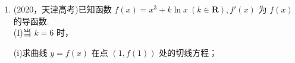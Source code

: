 \begin{enumerate}[label={【\textbf{例\thechapter.\arabic*}】},
 leftmargin=\inteval{\myenumleftmargin}pt,
 itemsep=\inteval{\myenumitempsep}pt,
 itemindent=\inteval{\myenumitemindent}pt]
让我们考虑如何挽救上面的方法，使之能解决本题。当$ a\to \dfrac{1}{\e} $时，$ x_0\to 1,\ x_1\to 1 $，对$ x_1 $的范围估计所使用的不等式$ x_1<-\ln a $右侧也能给出“1”这个结果，这意味着对$ x_1 $的范围估计基本不能再改进了。而对$ x_0 $的估计$ 1-\ln 2-\dfrac{1}{2}\ln a\to 1.5-\ln 2=0.806852\cdots (a\to \dfrac{1}{\e})$，与“1”的误差较大，还有改进的余地。前面使用了不等式$ x^2\leq \dfrac{4}{\e^2}\e^x $来估计$ x_0 $(因为这个不等式在2016年新课标全国II卷中出现过，容易让人首先想到)，函数$ y=x^2$和$ y=\dfrac{4}{\e^2}\e^x $在$ x=2 $处相等(同时相切)，而在$ x=1 $附近差别较大，如果能找到函数$ A\e^{\alpha x} $与$ x^2 $在$ x=1 $处相等(相切)，那么对$ x_0 $的估计精度就能提高。$ \begin{dcases}
A\e^{\alpha x}|_{x=1}=&x^2|_{x=1}\ 
   (\text{函数值相等})	\\
A\alpha \e^{\alpha x}|_{x=1}=&2x|_{x=1}\ 
	(\text{导数值相等})
\end{dcases}$，解得$ A=\e^{-2},\ \alpha=2 $，
即$ x^2\leq \e^{2x-2}\ (x>0) $，这个不等式其实可以从最常见的不等式$ \e^x\geq 1+x $衍生而来(把$ x $换成$ x-1 $，再两边平方)。于是$ \dfrac{1}{a}=\underbrace{x_0^2\e^{x_0}< (\e^{2x_0-2})\e^{x_0}}_{x_0>1,\ \text{“=”取不到}}=\e^{3x_0-2}\ \Rightarrow\ -\ln a< 3x_0-2 $，将$ \begin{dcases}
	 3x_0 > 2-\ln a	\\
	 -x_1 >\ln a
\end{dcases}$两式相加即得$ 3x_0-x_1>2 $.

\item (2020，天津高考)已知函数 $ f(x)=x^{3}+k\ln x\ (k\in\mathbf{R}),f'(x) $ 为 $ f(x) $ 的导函数. \\
(I)当 $ k=6 $ 时，

(i)求曲线 $ y=f(x) $ 在点 $ (1,f(1)) $ 处的切线方程；


\end{enumerate}
